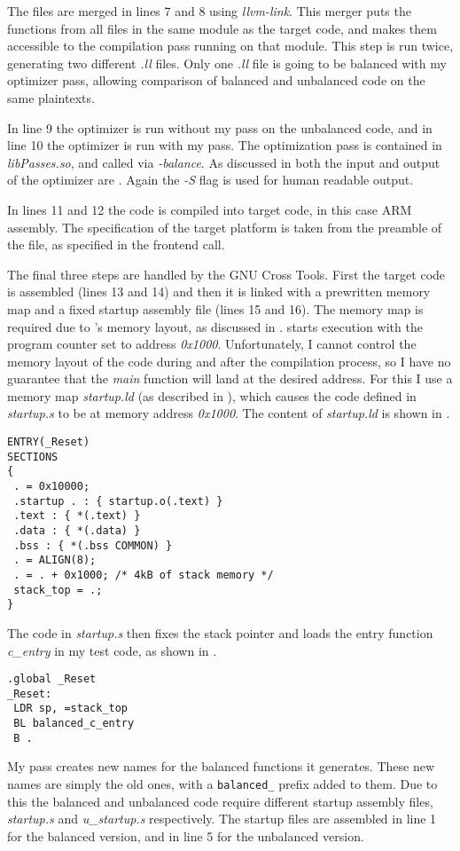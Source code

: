 The \ir{} files are merged in lines 7 and 8 using \emph{llvm-link}.
This merger puts the functions from all files in the same module as the target code, and makes them accessible to the compilation pass running on that module.
This step is run twice, generating two different \emph{.ll} files.
Only one \emph{.ll} file is going to be balanced with my optimizer pass, allowing comparison of balanced and unbalanced code on the same plaintexts.

In line 9 the \llvm{} optimizer is run without my pass on the unbalanced code, and in line 10 the optimizer is run with my pass.
The optimization pass is contained in \emph{libPasses.so}, and called via \emph{-balance}.
As discussed in  both the input and output of the optimizer are \ir{}.
Again the \emph{-S} flag is used for human readable output.

In lines 11 and 12 the \ir{} code is compiled into target code, in this case ARM assembly.
The specification of the target platform is taken from the preamble of the \ir{} file, as specified in the frontend call.

The final three steps are handled by the GNU Cross Tools.
First the target code is assembled (lines 13 and 14) and then it is linked with a prewritten memory map and a fixed startup assembly file (lines 15 and 16).
The memory map is required due to \qemu{}'s memory layout, as discussed in .
\qemu{} starts execution with the program counter set to address \emph{0x1000}.
Unfortunately, I cannot control the memory layout of the code during and after the compilation process, so I have no guarantee that the \emph{main} function will land at the desired address.
For this I use a memory map \emph{startup.ld} (as described in \cite{armbare}), which causes the code defined in \emph{startup.s} to be at memory address \emph{0x1000}.
The content of \emph{startup.ld} is shown in .

\begin{lstlisting}[caption=Memory map in \emph{startup.ld}, label=lst:mmap]
ENTRY(_Reset)
SECTIONS
{
 . = 0x10000;
 .startup . : { startup.o(.text) }
 .text : { *(.text) }
 .data : { *(.data) }
 .bss : { *(.bss COMMON) }
 . = ALIGN(8);
 . = . + 0x1000; /* 4kB of stack memory */
 stack_top = .;
}
\end{lstlisting}

The code in \emph{startup.s} then fixes the stack pointer and loads the entry function \emph{c\_entry} in my test code, as shown in .

\begin{lstlisting}[caption=Startup assembly code, label=lst:startup]
.global _Reset
_Reset:
 LDR sp, =stack_top
 BL balanced_c_entry
 B .
\end{lstlisting}

My pass creates new names for the balanced functions it generates.
These new names are simply the old ones, with a \texttt{balanced\_} prefix added to them.
Due to this the balanced and unbalanced code require different startup assembly files, \emph{startup.s} and \emph{u\_startup.s} respectively.
The startup files are assembled in line 1 for the balanced version, and in line 5 for the unbalanced version.
